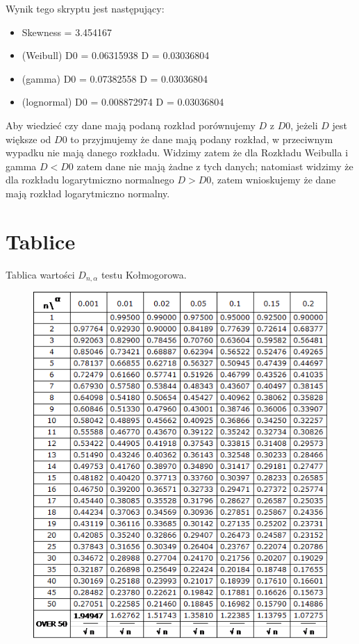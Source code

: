 \documentclass{article}
\begin{document}
Wynik tego skryptu jest następujący: 
\begin{itemize}
\item Skewness =  3.454167 
\item (Weibull) D0 =  0.06315938  D =  0.03036804 
\item (gamma) D0 =  0.07382558  D =  0.03036804 
\item (lognormal) D0 =  0.008872974  D =  0.03036804 
\end{itemize}
Aby wiedzieć czy dane mają podaną rozkład porównujemy $D$ z $D0$, jeżeli $D$ jest większe od $D0$ to przyjmujemy że dane mają podany rozkład, w przeciwnym wypadku nie mają danego rozkładu. Widzimy zatem że dla Rozkładu Weibulla i gamma $D < D0$ zatem dane nie mają żadne z tych danych; natomiast widzimy że dla rozkładu logarytmiczno normalnego $D > D0$, zatem wnioskujemy że dane mają rozkład logarytmiczno normalny.


\newpage
\section{Tablice}
 
Tablica wartości $D_{n,\alpha}$ testu Kołmogorowa.
\begin{figure}[h!] \begin{center}
\includegraphics[height=0.5\textheight, angle=0]{"pdf/tablicaK.png"}
\end{center} \end{figure}
\end{document}
